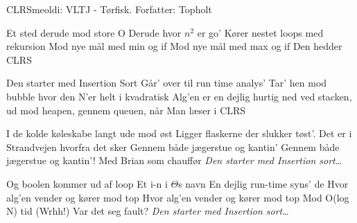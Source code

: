 \begin{sang}{CLRS}{meoldi: VLTJ - Tørfisk. Forfatter: Topholt}
    \begin{vers}
    Et sted derude mod store O
    Derude hvor $n^2$ er go'
    Kører nestet loops med rekursion
    Mod nye mål med min og if
    Mod nye mål med max og if
    Den hedder CLRS
    \end{vers}
    
    \begin{omkvaed}
    Den starter med Insertion Sort
    Går' over til run time analys'
    Tar' hen mod bubble hvor den N'er helt i kvadratisk
    Alg'en er en dejlig hurtig ned ved stacken, ud mod heapen, gennem queuen, når
    Man læser i CLRS
    \end{omkvaed}
    
    \begin{vers}
    I de kolde køleskabe langt ude mod øst
    Ligger flaskerne der slukker tøst'.
    Det er i Strandvejen hvorfra det sker
    Gennem både jægerstue og kantin'
    Gennem både jægerstue og kantin'!
    Med Brian som chauffør
    \emph{Den starter med Insertion sort}\ldots
    \end{vers}
    
    \begin{vers}
    Og boolen kommer ud af loop
    Et i-n i $\Theta$s navn
    En dejlig run-time syns' de
    Hvor alg'en vender og kører mod top
    Hvor alg'en vender og kører mod top
    Mod O(log N) tid (Wrhh!)
    Var det seg fault?
    \emph{Den starter med Insertion sort}\ldots
    \end{vers}
    
    \end{sang}